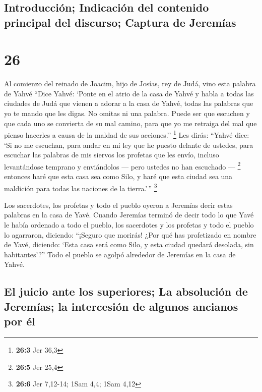 \hypertarget{introducciuxf3n-indicaciuxf3n-del-contenido-principal-del-discurso-captura-de-jeremuxedas}{%
\subsection{Introducción; Indicación del contenido principal del
discurso; Captura de
Jeremías}\label{introducciuxf3n-indicaciuxf3n-del-contenido-principal-del-discurso-captura-de-jeremuxedas}}

\hypertarget{section-25}{%
\section{26}\label{section-25}}

 Al comienzo del reinado de Joacim, hijo de Josías, rey de
Judá, vino esta palabra de Yahvé  ``Dice Yahvé: `Ponte en
el atrio de la casa de Yahvé y habla a todas las ciudades de Judá que
vienen a adorar a la casa de Yahvé, todas las palabras que yo te mando
que les digas. No omitas ni una palabra.  Puede ser que
escuchen y que cada uno se convierta de su mal camino, para que yo me
retraiga del mal que pienso hacerles a causa de la maldad de sus
acciones.'' \footnote{\textbf{26:3} Jer 36,3}  Les dirás:
``Yahvé dice: `Si no me escuchan, para andar en mi ley que he puesto
delante de ustedes,  para escuchar las palabras de mis
siervos los profetas que les envío, incluso levantándose temprano y
enviándolos --- pero ustedes no han escuchado --- \footnote{\textbf{26:5}
  Jer 25,4}  entonces haré que esta casa sea como Silo, y
haré que esta ciudad sea una maldición para todas las naciones de la
tierra.'\,'' \footnote{\textbf{26:6} Jer 7,12-14; 1Sam 4,4; 1Sam 4,12}

 Los sacerdotes, los profetas y todo el pueblo oyeron a
Jeremías decir estas palabras en la casa de Yavé.  Cuando
Jeremías terminó de decir todo lo que Yavé le había ordenado a todo el
pueblo, los sacerdotes y los profetas y todo el pueblo lo agarraron,
diciendo: ``¡Seguro que morirás!  ¿Por qué has profetizado
en nombre de Yavé, diciendo: `Esta casa será como Silo, y esta ciudad
quedará desolada, sin habitantes'?'' Todo el pueblo se agolpó alrededor
de Jeremías en la casa de Yahvé.

\hypertarget{el-juicio-ante-los-superiores-la-absoluciuxf3n-de-jeremuxedas-la-intercesiuxf3n-de-algunos-ancianos-por-uxe9l}{%
\subsection{El juicio ante los superiores; La absolución de Jeremías; la
intercesión de algunos ancianos por
él}\label{el-juicio-ante-los-superiores-la-absoluciuxf3n-de-jeremuxedas-la-intercesiuxf3n-de-algunos-ancianos-por-uxe9l}}

